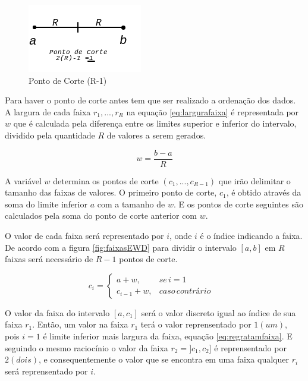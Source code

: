 \begin{figure}[h]
        \centering
        \includegraphics[scale=1]{figs/faixaA-B_PontoCorte.png}
        \caption{Ponto de Corte (R-1)} \label{fig:pontocorte}
\end{figure}

Para haver o ponto de corte antes tem que ser realizado a ordenação dos dados. A largura de cada faixa ${r_1,...,r_R}$ na equação \ref{eq:largurafaixa} é representada por ${w}$ que é calculada pela diferença entre os limites superior e inferior do intervalo, dividido pela quantidade ${R}$ de valores a serem gerados.

\begin{equation}
 w = \frac{b-a}{R}
 \label{eq:largurafaixa}
\end{equation}

A variável ${w}$ determina os pontos de corte ${(c_1,...,c_{R-1})}$ que irão delimitar o tamanho das faixas de valores. O primeiro ponto de corte, ${c_1}$, é obtido através da soma do limite inferior ${a}$ com a tamanho de ${w}$. E os pontos de corte seguintes são calculados pela soma do ponto de corte anterior com ${w}$.


O valor de cada faixa será representado por ${i}$, onde ${i}$ é o índice indicando a faixa. De acordo com a figura \ref{fig:faixasEWD} para dividir o intervalo ${[a,b]}$ em ${R}$ faixas será necessário de ${R-1}$ pontos de corte.

\begin{equation}
c_i=\left\{\begin{matrix}
a+w, & se\, i=1 & \\ 
c_{i-1}+w,  & caso\, contrário & 
\end{matrix}\right.
 \label{eq:regratamfaixa}
\end{equation}

O valor da faixa do intervalo ${[a,c_1]}$ será o valor discreto igual ao índice de sua faixa ${r_1}$. Então, um valor na faixa ${r_1}$ terá o valor reprensentado por ${1(um)}$, pois  ${i=1}$ é limite inferior mais largura da faixa, equação \ref{eq:regratamfaixa}. E seguindo o mesmo raciocínio o valor da faixa ${r_2=]c_1,c_2]}$ é reprensentado por ${2(dois)}$, e consequentemente o valor que se encontra em uma faixa qualquer ${r_i}$ será reprensentado por ${i}$.

